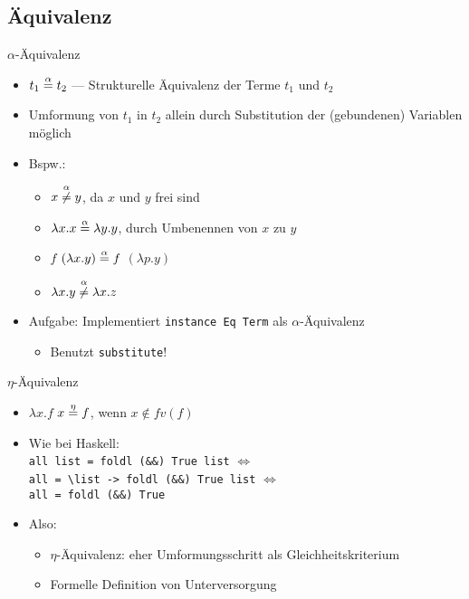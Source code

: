 \documentclass{beamer}
\begin{document}
\subsection{Äquivalenz}

\begin{frame}{$\alpha$-Äquivalenz}
	\begin{itemize}
		\item $t_1 \stackrel{\alpha}{=} t_2$ --- Strukturelle Äquivalenz der Terme $t_1$ und $t_2$
		\item Umformung von $t_1$ in $t_2$ allein durch Substitution der (gebundenen) Variablen möglich
		\pause
		\item Bspw.:
		\begin{itemize}
			\item $x \stackrel{\alpha}{\neq} y$, da $x$ und $y$ frei sind
			\item $\lambda{}x.x \stackrel{\alpha}{=} \lambda{}y.y$, durch Umbenennen von $x$ zu $y$
			\item $f$ $(\lambda{}x.y) \stackrel{\alpha}{=} f$ $(\lambda{}p.y)$
			\item $\lambda{}x.y \stackrel{\alpha}{\neq} \lambda{}x.z$
		\end{itemize}
		\pause
		\item Aufgabe: Implementiert \texttt{instance Eq Term} als $\alpha$-Äquivalenz
		\begin{itemize}
			\item Benutzt \texttt{substitute}!
		\end{itemize}
	\end{itemize}
\end{frame}

\begin{frame}{$\eta$-Äquivalenz}
	\begin{itemize}
		\item $\lambda{}x.f$ $x \stackrel{\eta}{=} f$, wenn $x \notin fv(f)$
		\item Wie bei Haskell:\\
	              \texttt{all list = foldl (\&\&) True list} $\Leftrightarrow$\\
		      \texttt{all = \textbackslash{}list -> foldl (\&\&) True list} $\Leftrightarrow$\\
		      \texttt{all = foldl (\&\&) True}
		\item Also:
		\begin{itemize}
			\item $\eta$-Äquivalenz: eher Umformungsschritt als Gleichheitskriterium
			\item Formelle Definition von Unterversorgung
		\end{itemize}
	\end{itemize}
\end{frame}
\end{document}
